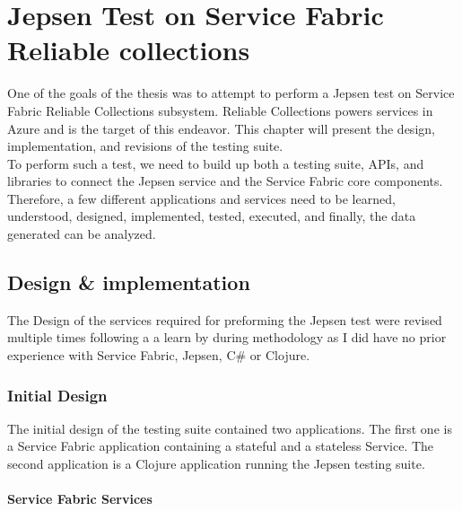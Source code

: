 \documentclass[a4paper,10pt,titlepage]{report}
\begin{document}
    \chapter{Jepsen Test on Service Fabric Reliable collections}

    One of the goals of the thesis was to attempt to perform a Jepsen test on Service Fabric Reliable Collections subsystem. Reliable Collections powers services in Azure and is the target of this endeavor. 
    This chapter will present the design, implementation, and revisions of the testing suite. \\
    \vspace{5mm}
    To perform such a test, we need to build up both a testing suite, APIs, and libraries to connect the Jepsen service and the Service Fabric core components. Therefore, a few different applications and services need to be learned, understood, designed, implemented, tested, executed, and finally, the data generated can be analyzed.
    

    \section{Design \& implementation}
    The Design of the services required for preforming the Jepsen test were revised multiple times following a a learn by during methodology as I did have no prior experience with Service Fabric, Jepsen, C\# or Clojure. 

    \subsection{Initial Design}

    The initial design of the testing suite contained two applications. The first one is a Service Fabric application containing a stateful and a stateless Service. The second application is a Clojure application running the Jepsen testing suite.

    \subsubsection{Service Fabric Services}
\end{document}
